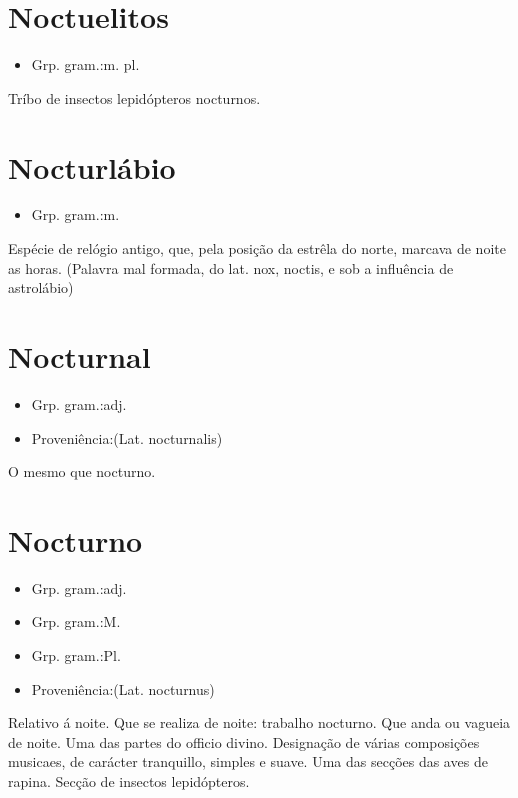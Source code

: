 \section{Noctuelitos}
\begin{itemize}
\item {Grp. gram.:m. pl.}
\end{itemize}
Tríbo de insectos lepidópteros nocturnos.
\section{Nocturlábio}
\begin{itemize}
\item {Grp. gram.:m.}
\end{itemize}
Espécie de relógio antigo, que, pela posição da estrêla do norte, marcava de noite as horas.
(Palavra mal formada, do lat. \textunderscore nox\textunderscore , \textunderscore noctis\textunderscore , e sob a influência de astrolábio)
\section{Nocturnal}
\begin{itemize}
\item {Grp. gram.:adj.}
\end{itemize}
\begin{itemize}
\item {Proveniência:(Lat. \textunderscore nocturnalis\textunderscore )}
\end{itemize}
O mesmo que \textunderscore nocturno\textunderscore .
\section{Nocturno}
\begin{itemize}
\item {Grp. gram.:adj.}
\end{itemize}
\begin{itemize}
\item {Grp. gram.:M.}
\end{itemize}
\begin{itemize}
\item {Grp. gram.:Pl.}
\end{itemize}
\begin{itemize}
\item {Proveniência:(Lat. \textunderscore nocturnus\textunderscore )}
\end{itemize}
Relativo á noite.
Que se realiza de noite: \textunderscore trabalho nocturno\textunderscore .
Que anda ou vagueia de noite.
Uma das partes do officio divino.
Designação de várias composições musicaes, de carácter tranquillo, simples e suave.
Uma das secções das aves de rapina.
Secção de insectos lepidópteros.
